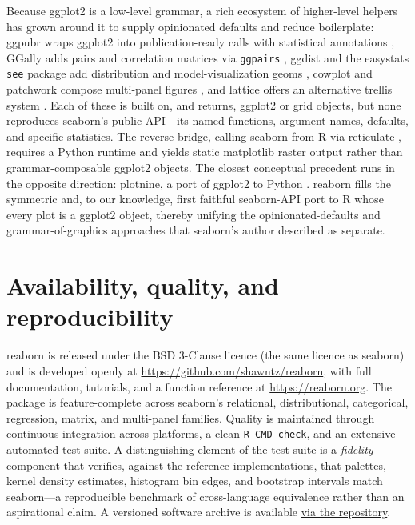 \documentclass[11pt]{article}
\begin{document}
Because ggplot2 is a low-level grammar, a rich ecosystem of higher-level helpers has
grown around it to supply opinionated defaults and reduce boilerplate: ggpubr wraps
ggplot2 into publication-ready calls with statistical annotations \citep{ggpubr},
GGally adds pairs and correlation matrices via \texttt{ggpairs} \citep{ggally},
ggdist and the easystats \texttt{see} package add distribution and
model-visualization geoms \citep{kay2024ggdist, ludecke2021see}, cowplot and
patchwork compose multi-panel figures \citep{wilke2024cowplot, patchwork}, and
lattice offers an alternative trellis system \citep{sarkar2008lattice}. Each of
these is built on, and returns, ggplot2 or grid objects, but none reproduces
seaborn's public API---its named functions, argument names, defaults, and specific
statistics. The reverse bridge, calling seaborn from R via reticulate
\citep{reticulate}, requires a Python runtime and yields static matplotlib raster
output rather than grammar-composable ggplot2 objects. The closest conceptual
precedent runs in the opposite direction: plotnine, a port of ggplot2 to Python
\citep{kibirige2025plotnine}. reaborn fills the symmetric and, to our knowledge,
first faithful seaborn-API port to R whose every plot is a ggplot2 object, thereby
unifying the opinionated-defaults and grammar-of-graphics approaches that seaborn's
author described as separate.

\section{Availability, quality, and reproducibility}

reaborn is released under the BSD 3-Clause licence (the same licence as seaborn) and
is developed openly at \url{https://github.com/shawntz/reaborn}, with full
documentation, tutorials, and a function reference at \url{https://reaborn.org}. The
package is feature-complete across seaborn's relational, distributional, categorical,
regression, matrix, and multi-panel families. Quality is maintained through
continuous integration across platforms, a clean \texttt{R CMD check}, and an
extensive automated test suite. A distinguishing element of the test suite is a
\emph{fidelity} component that verifies, against the reference implementations, that
palettes, kernel density estimates, histogram bin edges, and bootstrap intervals
match seaborn---a reproducible benchmark of cross-language equivalence rather than an
aspirational claim. A versioned software archive is available
\href{https://github.com/shawntz/reaborn}{via the repository}.%
\end{document}
